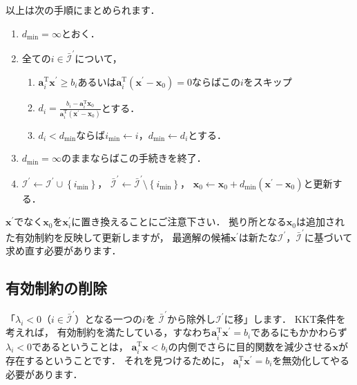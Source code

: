 ﻿\documentclass{jsarticle}
\begin{document}
以上は次の手順にまとめられます．
\begin{screen}
\begin{enumerate}
\item
$d_{\mathrm{min}}=\infty$とおく．
\item
全ての$i\in\bar{\mathcal{I}}^{\prime}$について，
 \begin{enumerate}
 \item $\boldsymbol{a}_{i}^{\mathrm{T}}\boldsymbol{x}^{\prime}\geq b_{i}$あるいは$\boldsymbol{a}_{i}^{\mathrm{T}}(\boldsymbol{x}^{\prime}-\boldsymbol{x}_{0})=0$ならばこの$i$をスキップ
 \item $d_{i}=\frac{b_{i}-\boldsymbol{a}_{i}^{\mathrm{T}}\boldsymbol{x}_{0}}{\boldsymbol{a}_{i}^{\mathrm{T}}(\boldsymbol{x}^{\prime}-\boldsymbol{x}_{0})}$とする．
 \item $d_{i}<d_{\mathrm{min}}$ならば$i_{\mathrm{min}}\leftarrow i$，$d_{\mathrm{min}}\leftarrow d_{i}$とする．
 \end{enumerate}
\item $d_{\mathrm{min}}=\infty$のままならばこの手続きを終了．
\item $\mathcal{I}^{\prime}\leftarrow\mathcal{I}^{\prime}\cup\left\{i_{\mathrm{min}}\right\}$，
$\bar{\mathcal{I}}^{\prime}\leftarrow\bar{\mathcal{I}}^{\prime}\setminus\left\{i_{\mathrm{min}}\right\}$，
$\boldsymbol{x}_{0}\leftarrow \boldsymbol{x}_{0}+d_{\mathrm{min}}(\boldsymbol{x}^{\prime}-\boldsymbol{x}_{0})$と更新する．
\end{enumerate}
\end{screen}

$\boldsymbol{x}^{\prime}$でなく$\boldsymbol{x}_{0}$を$\boldsymbol{x}_{i}^{\prime}$に置き換えることにご注意下さい．
拠り所となる$\boldsymbol{x}_{0}$は追加された有効制約を反映して更新しますが，
最適解の候補$\boldsymbol{x}^{\prime}$は新たな$\mathcal{I}^{\prime}$，$\bar{\mathcal{I}}^{\prime}$に基づいて
求め直す必要があります．


\subsection{有効制約の削除}

「$\lambda_{i}<0$（$i\in\bar{\mathcal{I}}^{\prime}$）となる一つの$i$を
$\bar{\mathcal{I}}^{\prime}$から除外し$\mathcal{I}^{\prime}$に移」します．
KKT条件を考えれば，
有効制約を満たしている，すなわち$\boldsymbol{a}_{i}^{\mathrm{T}}\boldsymbol{x}^{\prime}=b_{i}$であるにもかかわらず
$\lambda_{i}<0$であるということは，
$\boldsymbol{a}_{i}^{\mathrm{T}}\boldsymbol{x}<b_{i}$の内側でさらに目的関数を減少させる$\boldsymbol{x}$が存在するということです．
それを見つけるために，
$\boldsymbol{a}_{i}^{\mathrm{T}}\boldsymbol{x}^{\prime}=b_{i}$を無効化してやる必要があります．
\end{document}
